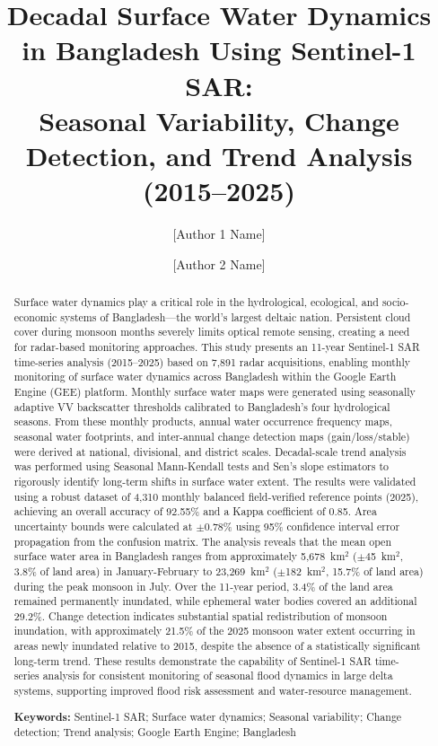 \documentclass[fleqn,10pt]{article}
\title{
Decadal Surface Water Dynamics in Bangladesh Using Sentinel-1 SAR:\\
Seasonal Variability, Change Detection, and Trend Analysis (2015--2025)
}
\author[1]{[Author 1 Name]}
\author[2]{[Author 2 Name]}
\affil[1]{[Author 1 Affiliation Details]}
\affil[2]{[Author 2 Affiliation Details]}
\affil[*]{Corresponding author: [Contact Email]} %
\date{} %
\date{}
\begin{document}
\maketitle

\begin{abstract}
Surface water dynamics play a critical role in the hydrological, ecological, and socio-economic systems of Bangladesh---the world's largest deltaic nation. Persistent cloud cover during monsoon months severely limits optical remote sensing, creating a need for radar-based monitoring approaches. This study presents an 11-year Sentinel-1 SAR time-series analysis (2015--2025) based on 7,891 radar acquisitions, enabling monthly monitoring of surface water dynamics across Bangladesh within the Google Earth Engine (GEE) platform. Monthly surface water maps were generated using seasonally adaptive VV backscatter thresholds calibrated to Bangladesh's four hydrological seasons. From these monthly products, annual water occurrence frequency maps, seasonal water footprints, and inter-annual change detection maps (gain/loss/stable) were derived at national, divisional, and district scales. Decadal-scale trend analysis was performed using Seasonal Mann-Kendall tests and Sen's slope estimators to rigorously identify long-term shifts in surface water extent. The results were validated using a robust dataset of 4,310 monthly balanced field-verified reference points (2025), achieving an overall accuracy of 92.55\% and a Kappa coefficient of 0.85. Area uncertainty bounds were calculated at $\pm0.78\%$ using 95\% confidence interval error propagation from the confusion matrix. The analysis reveals that the mean open surface water area in Bangladesh ranges from approximately 5,678~km$^2$ ($\pm$45~km$^2$, 3.8\% of land area) in January-February to 23,269~km$^2$ ($\pm$182~km$^2$, 15.7\% of land area) during the peak monsoon in July. Over the 11-year period, 3.4\% of the land area remained permanently inundated, while ephemeral water bodies covered an additional 29.2\%. Change detection indicates substantial spatial redistribution of monsoon inundation, with approximately 21.5\% of the 2025 monsoon water extent occurring in areas newly inundated relative to 2015, despite the absence of a statistically significant long-term trend. These results demonstrate the capability of Sentinel-1 SAR time-series analysis for consistent monitoring of seasonal flood dynamics in large delta systems, supporting improved flood risk assessment and water-resource management.

\vspace{0.5em}
\noindent\textbf{Keywords:} Sentinel-1 SAR; Surface water dynamics; Seasonal variability; Change detection; Trend analysis; Google Earth Engine; Bangladesh
\end{abstract}
\end{document}

